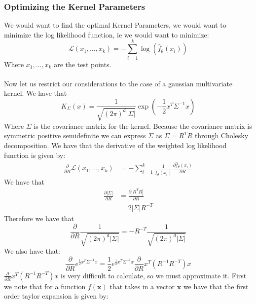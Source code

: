 \documentclass[10pt]{article}
\begin{document}
\subsubsection{Optimizing the Kernel Parameters}
We would want to find the optimal Kernel Parameters, we would want to minimize the log likelihood function, ie we would want to minimize:
\begin{equation}
    \mathcal{L}(x_1,\dots,x_k) = -\sum_{i=1}^k \log(\hat{f}_{\theta}(x_i))
\end{equation}
Where $x_1,\dots,x_k$ are the test points.\\\\
Now let us restrict our considerations to the case of a gaussian multivariate kernel. We have that
$$K_{\Sigma}(x) = \frac{1}{\sqrt{(2\pi)^d|\Sigma|}}\exp\left(-\frac{1}{2}x^T\Sigma^{-1}x\right)$$
Where $\Sigma$ is the covariance matrix for the kernel. Because the 
covariance matrix is symmetric positive semidefinite 
we can express $\Sigma$ as $\Sigma = R^TR$ through Cholesky decomposition.
We have that the derivative of the 
weighted log likelihood function is given by:
\begin{align*}
    \frac{\partial}{\partial R}\mathcal{L}(x_1,\dots,x_k) &= -\sum_{i=1}^k \frac{1}{\hat{f}_{\theta}(x_i)} \frac{\partial \hat{f}_{\theta}(x_i)}{\partial R}
\end{align*}
We have that 
\begin{align*}
    \frac{\partial |\Sigma|}{\partial R} &= \frac{\partial |R^TR|}{\partial R} \\
    &= 2|\Sigma|R^{-T}
\end{align*}
Therefore we have that 
\begin{equation}
    \frac{\partial}{\partial R}\frac{1}{\sqrt{(2\pi)^d|\Sigma|}} = -R^{-T}\frac{1}{\sqrt{(2\pi)^d|\Sigma|}}
\end{equation}
We also have that:
\begin{equation}
    \frac{\partial}{\partial R} e^{\frac{1}{2}x^T\Sigma^{-1}x} = \frac{1}{2}e^{\frac{1}{2}x^T\Sigma^{-1}x} \frac{\partial}{\partial R} x^T(R^{-1}R^{-T})x
\end{equation}
$\frac{\partial}{\partial R} x^T(R^{-1}R^{-T})x$ is very difficult to calculate, so we must approximate it. First we note that for 
a function $f(\mathbf{x})$ that takes in a vector $\mathbf{x}$ we have that the first order taylor expansion is given by:
\end{document}
